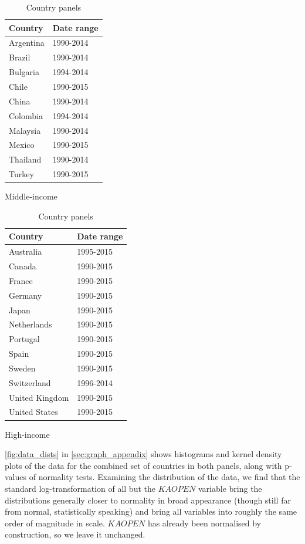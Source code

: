 \documentclass[12pt,a4paper]{article}
\begin{document}
\renewcommand{\arraystretch}{1}
\begin{table}[htbp]
\centering
\begin{subtable}{0.45\textwidth}
\centering
\begin{tabular}{ll}
\toprule
   Country & Date range \\
\midrule
 Argentina &  1990-2014 \\
    Brazil &  1990-2014 \\
  Bulgaria &  1994-2014 \\
     Chile &  1990-2015 \\
     China &  1990-2014 \\
  Colombia &  1994-2014 \\
  Malaysia &  1990-2014 \\
    Mexico &  1990-2015 \\
  Thailand &  1990-2014 \\
    Turkey &  1990-2015 \\
\bottomrule
\end{tabular}
\caption{Middle-income}
\end{subtable}
\begin{subtable}{0.45\textwidth}
\centering
\begin{tabular}{ll}
\toprule
        Country & Date range \\
\midrule
      Australia &  1995-2015 \\
         Canada &  1990-2015 \\
         France &  1990-2015 \\
        Germany &  1990-2015 \\
          Japan &  1990-2015 \\
    Netherlands &  1990-2015 \\
       Portugal &  1990-2015 \\
          Spain &  1990-2015 \\
         Sweden &  1990-2015 \\
    Switzerland &  1996-2014 \\
 United Kingdom &  1990-2015 \\
  United States &  1990-2015 \\
\bottomrule
\end{tabular}
\caption{High-income}
\end{subtable}
\caption{Country panels}
\label{tab:countries}
\end{table}

\cref{fig:data_dists} in \cref{sec:graph_appendix} shows histograms and kernel density plots of the data for the combined set of countries in both panels, along with p-values of \cite{dagostinoTestsDepartureNormality1973} normality tests.
Examining the distribution of the data, we find that the standard log-transformation of all but the $KAOPEN$ variable bring the distributions generally closer to normality in broad appearance (though still far from normal, statistically speaking) and bring all variables into roughly the same order of magnitude in scale.
$KAOPEN$ has already been normalised by construction, so we leave it unchanged.
\end{document}
